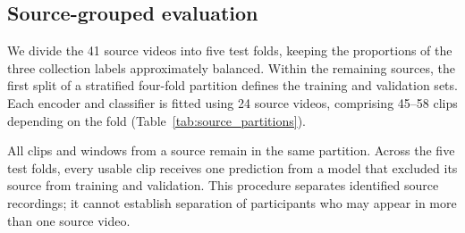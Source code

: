 \subsection{Source-grouped evaluation}
We divide the 41 source videos into five test folds, keeping the proportions of the three collection labels approximately balanced. Within the remaining sources, the first split of a stratified four-fold partition defines the training and validation sets. Each encoder and classifier is fitted using 24 source videos, comprising 45--58 clips depending on the fold (Table~\ref{tab:source_partitions}).

All clips and windows from a source remain in the same partition. Across the five test folds, every usable clip receives one prediction from a model that excluded its source from training and validation. This procedure separates identified source recordings; it cannot establish separation of participants who may appear in more than one source video.
